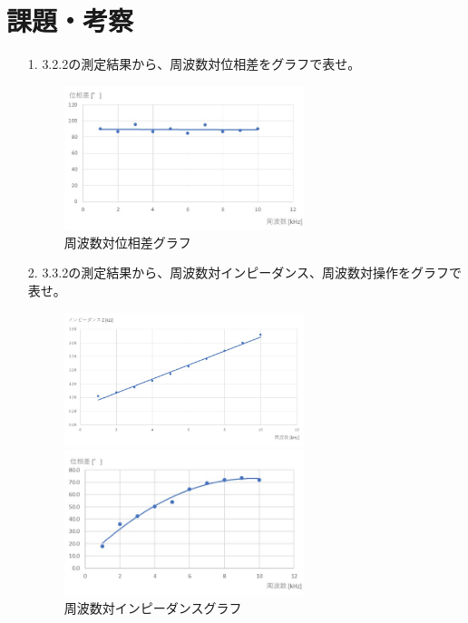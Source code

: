 \documentclass[a4paper]{jarticle}
\begin{document}
	\section{課題・考察}
		\begin{enumerate}
			\item[1.]{3.2.2の測定結果から、周波数対位相差をグラフで表せ。}
				\begin{figure}[h]
					\begin{center}
						\includegraphics[width = 7cm]{RL直列回路と交流グラフ1.jpg}
					\end{center}
					\caption{周波数対位相差グラフ}
				\end{figure}
			\item[2.]{3.3.2の測定結果から、周波数対インピーダンス、周波数対操作をグラフで表せ。}
				\begin{figure}[h]
					\begin{minipage}{0.5\hsize}
						\begin{center}
							\includegraphics[width = 7cm]{RL直列回路と交流グラフ2.jpg}
						\end{center}
						\caption{周波数対インピーダンスグラフ}
					\end{minipage}
					\begin{minipage}{0.5\hsize}
						\begin{center}
							\includegraphics[width = 7cm]{RL直列回路と交流グラフ3.jpg}

\end{center}
\end{minipage}
\end{figure}
\end{enumerate}
\end{document}
